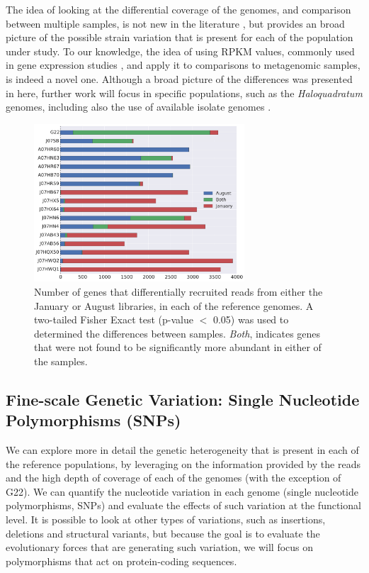 The idea of looking at the differential coverage of the genomes, and comparison between multiple samples, is not new in the literature \cite{DyallSmith:2011tu,Pasic:2009bo}, but provides an broad picture of the possible strain variation that is present for each of the population under study. To our knowledge, the idea of using RPKM values, commonly used in gene expression studies \cite{Mortazavi:2008jj}, and apply it to comparisons to metagenomic samples, is indeed a novel one. Although a broad picture of the differences was presented in here, further work will focus in specific populations, such as the \textit{Haloquadratum} genomes, including also the use of available isolate genomes \cite{DyallSmith:2011tu}.

\begin{figure}[!hbtp]
  \centering
  \includegraphics[width=0.7\textwidth]{Chapter5/Figures/GeneDifferencesSeason.pdf}
  \caption{Number of genes that differentially recruited reads from either the January or August libraries, in each of the reference genomes. A two-tailed Fisher Exact test (p-value $<$ 0.05) was used to determined the differences between samples. \textit{Both}, indicates genes that were not found to be significantly more abundant in either of the samples.} 
  \label{CoverageGenes}
\end{figure}

\clearpage
\subsection{Fine-scale Genetic Variation: Single Nucleotide Polymorphisms (SNPs)}

We can explore more in detail the genetic heterogeneity that is present in each of the reference populations, by leveraging on the information provided by the reads and the high depth of coverage of each of the genomes (with the exception of G22). We can quantify the nucleotide variation in each genome (single nucleotide polymorphisms, SNPs) and evaluate the effects of such variation at the functional level. It is possible to look at other types of variations, such as insertions, deletions and structural variants, but because the goal is to evaluate the evolutionary forces that are generating such variation, we will focus on polymorphisms that act on protein-coding sequences.

